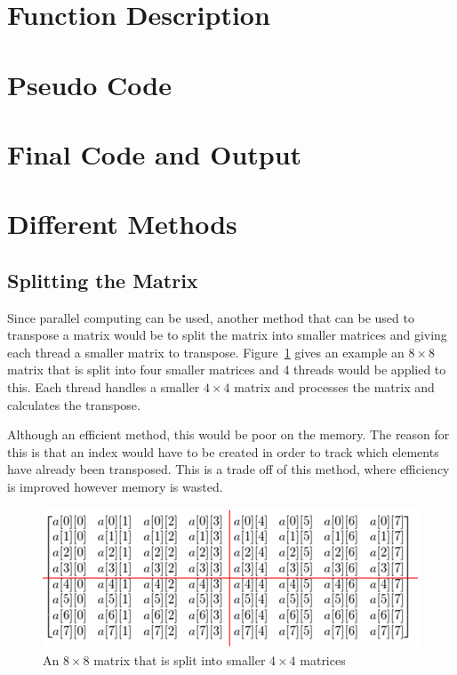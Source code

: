 \documentclass[10pt, conference]{IEEEtran}
\begin{document}
\section{Function Description}
\label{Function Description}

\section{Pseudo Code}
\label{Pseudo Code}

\section{Final Code and Output}
\label{Final Code and Output}

\section{Different Methods}
\label{Different Methods}

\subsection{Splitting the Matrix}
\label{Splitting the Matrix}
Since parallel computing can be used, another method that can be used to transpose a matrix would be to split the matrix into smaller matrices and giving each thread a smaller matrix to transpose. Figure~\ref{Splitting} gives an example an $8\times8$ matrix that is split into four smaller matrices and 4 threads would be applied to this. Each thread handles a smaller $4\times4$ matrix and processes the matrix and calculates the transpose.

Although an efficient method, this would be poor on the memory. The reason for this is that an index would have to be created in order to track which elements have already been transposed. This is a trade off of this method, where efficiency is improved however memory is wasted.

\begin{figure}[h!]
\renewcommand{\thefigure}{\arabic{figure}}
\centering
\includegraphics[scale=0.4]{Splitting.png}
\caption{An $8\times8$ matrix that is split into smaller $4\times4$ matrices}
\label{Splitting}
\end{figure}
\end{document}
